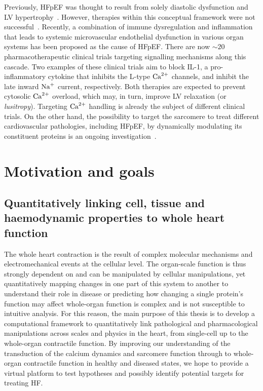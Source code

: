 \vspace{0.2cm}
Previously, HFpEF was thought to result from solely diastolic dysfunction and LV hypertrophy~\cite{Patel:2019}. However, therapies within this conceptual framework were not successful~\cite{Cleland:2014}. Recently, a combination of immune dysregulation and inflammation that leads to systemic microvascular endothelial dysfunction in various organ systems has been proposed as the cause of HFpEF. There are now $\sim 20$ pharmacotherapeutic clinical trials targeting signalling mechanisms along this cascade. Two examples of these clinical trials aim to block IL-1, a pro-inflammatory cytokine that inhibits the L-type $\textrm{Ca}^{2+}$ channels, and inhibit the late inward $\textrm{Na}^{+}$ current, respectively. Both therapies are expected to prevent cytosolic $\textrm{Ca}^{2+}$ overload, which may, in turn, improve LV relaxation (or \textit{lusitropy}). Targeting $\textrm{Ca}^{2+}$ handling is already the subject of different clinical trials. On the other hand, the possibility to target the sarcomere to treat different cardiovascular pathologies, including HFpEF, by dynamically modulating its constituent proteins is an ongoing investigation~\cite{Patel:2019}.


%
%
%
\section{Motivation and goals}\label{sec:ch1motivation_and_goals}

%
%
%
\subsection{Quantitatively linking cell, tissue and haemodynamic properties to whole heart function}
The whole heart contraction is the result of complex molecular mechanisms and electromechanical events at the cellular level. The organ-scale function is thus strongly dependent on and can be manipulated by cellular manipulations, yet quantitatively mapping changes in one part of this system to another to understand their role in disease or predicting how changing a single protein's function may affect whole-organ function is complex and is not susceptible to intuitive analysis. For this reason, the main purpose of this thesis is to develop a computational framework to quantitatively link pathological and pharmacological manipulations across scales and physics in the heart, from single-cell up to the whole-organ contractile function. By improving our understanding of the transduction of the calcium dynamics and sarcomere function through to whole-organ contractile function in healthy and diseased states, we hope to provide a virtual platform to test hypotheses and possibly identify potential targets for treating HF.


